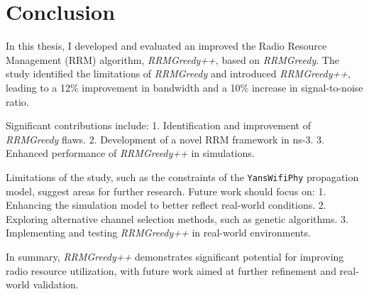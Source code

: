 \chapter{Conclusion}
\label{chap:conclusion}

In this thesis, I developed and evaluated an improved the Radio Resource Management (RRM) algorithm, \textit{RRMGreedy++}, based on \textit{RRMGreedy}. The study identified the limitations of \textit{RRMGreedy} and introduced \textit{RRMGreedy++}, leading to a 12\% improvement in bandwidth and a 10\% increase in signal-to-noise ratio. 

Significant contributions include:
1. Identification and improvement of \textit{RRMGreedy} flaws.
2. Development of a novel RRM framework in ns-3.
3. Enhanced performance of \textit{RRMGreedy++} in simulations.

Limitations of the study, such as the constraints of the \texttt{YansWifiPhy} propagation model, suggest areas for further research. Future work should focus on:
1. Enhancing the simulation model to better reflect real-world conditions.
2. Exploring alternative channel selection methods, such as genetic algorithms.
3. Implementing and testing \textit{RRMGreedy++} in real-world environments.

In summary, \textit{RRMGreedy++} demonstrates significant potential for improving radio resource utilization, with future work aimed at further refinement and real-world validation.

